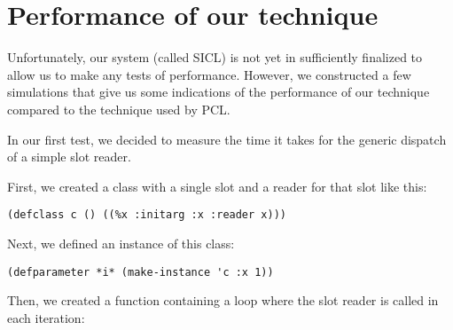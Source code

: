 \section{Performance of our technique}

Unfortunately, our system (called SICL) is not yet in sufficiently
finalized to allow us to make any tests of performance.  However, we
constructed a few simulations that give us some indications of the
performance of our technique compared to the technique used by PCL.

In our first test, we decided to measure the time it takes for the
generic dispatch of a simple slot reader. 

First, we created a class with a single slot and a reader for that
slot like this:

{\small\begin{verbatim}
(defclass c () ((%x :initarg :x :reader x)))  
\end{verbatim}}

Next, we defined an instance of this class:

{\small\begin{verbatim}
(defparameter *i* (make-instance 'c :x 1))
\end{verbatim}}

Then, we created a function containing a loop where the slot reader is
called in each iteration: 

